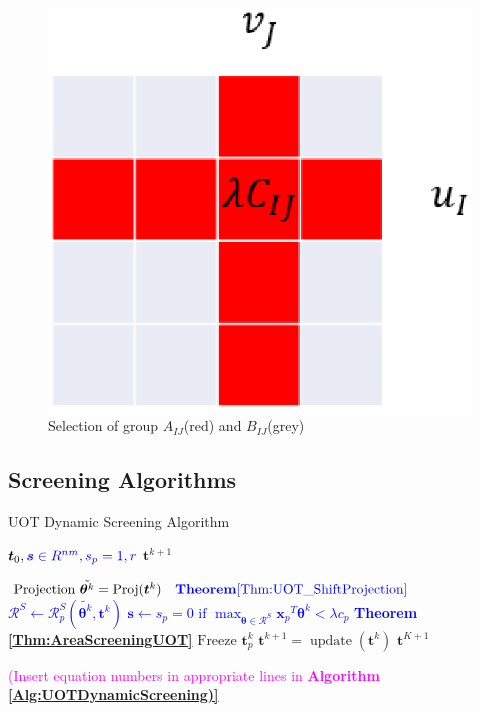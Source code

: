 \documentclass[twoside]{article}
\theoremstyle{plain}
\renewcommand{\vec}[1]{\bm{#1}}
\newcommand{\changeXS}[1]{\textcolor{blue}{#1}}
\newcommand{\note}[1]{\textcolor{magenta}{#1}}
\begin{document}
\begin{figure}[h]
\begin{center}
\includegraphics[width = 0.7\linewidth]{pic/divide}
\caption{Selection of group $A_{IJ}$(red) and $B_{IJ}$(grey)}
\end{center}
\end{figure}

\subsection{Screening Algorithms}

 \begin{algorithm}
 \caption{UOT Dynamic Screening Algorithm}
 \begin{algorithmic}[h]
 \label{Alg:UOTDynamicScreening}
 \renewcommand{\algorithmicrequire}{\textbf{Input:}}
 \renewcommand{\algorithmicensure}{\textbf{Output:}}
 \REQUIRE $\vec{t}_0,  \changeXS{\vec s \in R^{nm}, s_{p}=1, r}$
 \ENSURE $\vec t^{k+1}$
 \STATE {}

 \STATE $\text{Projection } \tilde{\vec{\theta}^{k}} = \operatorname{Proj}(\vec{t}^k) \changeXS{\quad \bf Theorem \ref{Thm:UOT_ShiftProjection}}$  
  \STATE  \changeXS{$\mathcal{R}^{S} \leftarrow \mathcal{R}_{p}^S{(\tilde{\vec{\theta}^{k}},\vec{t}^k)}$}
   \STATE  \changeXS{$\vec s \leftarrow {s_{p} = 0 \text{ if } \max_{\vec{\theta} \in \mathcal{R}^S} {\vec x_{p}}^T\vec{\theta}^{k} <\lambda c_{p} }$ \bf Theorem \ref{Thm:AreaScreeningUOT}}
  \ENDFOR
   \FOR  { \changeXS{$p \in \{p\|s_{p}=0\}$}}
  \STATE $\text{Freeze     }\vec{t}^k_p $
  \ENDFOR
   \ENDIF
  \STATE $\vec{t}^{k+1} = \operatorname{update}(\vec{t}^k)$
 \ENDFOR
   \RETURN $\vec{t}^{K+1} $
 \end{algorithmic} 
 \end{algorithm}
\note{(Insert equation numbers in appropriate lines in {\bf Algorithm \ref{Alg:UOTDynamicScreening)}}}
\end{document}
